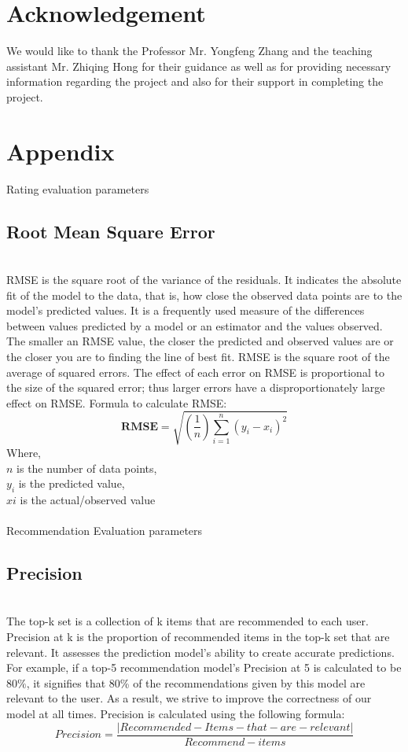 \documentclass[sigconf]{acmart}
\begin{document}
\section{Acknowledgement}
We would like to thank the Professor Mr. Yongfeng Zhang
and the teaching assistant Mr. Zhiqing Hong for their guidance
as well as for providing necessary information regarding the
project and also for their support in completing the project.





\section{Appendix}
Rating evaluation parameters 
\subsection{Root Mean Square Error} \\
RMSE is the square root of the variance of the residuals. It indicates the absolute fit of the model to the data, that is, how close the observed data points are to the model’s predicted values. It is a frequently used measure of the differences between values predicted by a model or an estimator and the values observed. The smaller an RMSE value, the closer the predicted and observed values are or the closer you are to finding the line of best fit. RMSE is the square root of the average of squared errors. The effect of each error on RMSE is proportional to the size of the squared error; thus larger errors have a disproportionately large effect on RMSE.
Formula to calculate RMSE:
$$
\textbf{RMSE} = \sqrt{(\frac{1}{n}) \sum_{i=1}^n(y_i-x_i)^2}
$$
Where,\\
$n$ is the number of data points,\\
$y_i$ is the predicted value,\\
$xi$ is the actual/observed value\\\\
Recommendation Evaluation parameters\\
\subsection{Precision} \\
The top-k set is a collection of k items that are recommended to each user.
Precision at k is  the proportion of recommended items in the top-k set that are relevant.
It assesses the prediction model's ability to create accurate predictions.
For example, if a top-5 recommendation model's Precision at 5 is calculated to be $80\% $, it signifies that 80\% of the recommendations given by this model are relevant to the user.
As a result, we strive to improve the correctness of our model at all times.
Precision is calculated using the following formula: \\
$$
Precision = \frac{|Recommended-Items-that-are-relevant|}{Recommend-items }
$$
\end{document}
